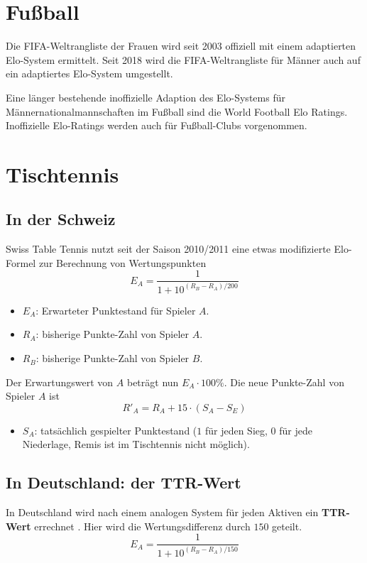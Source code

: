 \section{Fußball}

Die FIFA-Weltrangliste der Frauen wird seit 2003 offiziell mit einem adaptierten Elo-System ermittelt. Seit 2018 wird die FIFA-Weltrangliste für Männer auch auf ein adaptiertes Elo-System umgestellt. \cite{fifa2018weltrangliste}

Eine länger bestehende inoffizielle Adaption des Elo-Systems für Männernationalmannschaften im Fußball sind die World Football Elo Ratings. Inoffizielle Elo-Ratings werden auch für Fußball-Clubs vorgenommen.


\section{Tischtennis}

\subsection{In der Schweiz}

Swiss Table Tennis nutzt seit der Saison 2010/2011 eine etwas modifizierte Elo-Formel zur Berechnung von Wertungspunkten
\[
    E_{A} = \frac{1}{1 + 10^{(R_{B} - R_{A}) / 200}}
\]
\begin{itemize}
    \item[] $E_{A}$: Erwarteter Punktestand für Spieler $A$.
    \item[] $R_{A}$: bisherige Punkte-Zahl von Spieler $A$.
    \item[] $R_{B}$: bisherige Punkte-Zahl von Spieler $B$.
\end{itemize}
Der Erwartungswert von $A$ beträgt nun $E_{A} \cdot 100 \%$. Die neue Punkte-Zahl von Spieler $A$ ist
\[
    R'_{A} = R_{A} + 15 \cdot (S_{A} - S_{E})
\]
\begin{itemize}
    \item[] $S_{A}$: tatsächlich gespielter Punktestand ($1$ für jeden Sieg, $0$ für jede Niederlage, Remis ist im Tischtennis nicht möglich).
\end{itemize}


\subsection{In Deutschland: der TTR-Wert}

In Deutschland wird nach einem analogen System für jeden Aktiven ein \textbf{TTR-Wert} errechnet \cite{tischtennis2020heft11}. Hier wird die Wertungsdifferenz durch $150$ geteilt.
\[
    E_{A} = \frac{1}{1 + 10^{(R_{B} - R_{A}) / 150}}
\]


